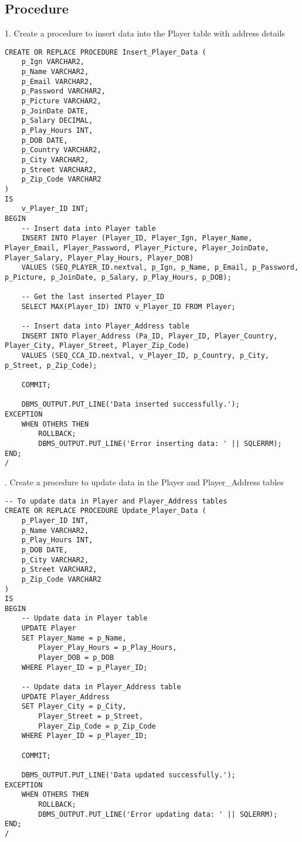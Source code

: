 \clearpage
\subsection{Procedure}
\hrulefill

1. Create a procedure to insert data into the Player table with address details

\begin{lstlisting}[caption={ Query 1},label={lst:q-1}]
CREATE OR REPLACE PROCEDURE Insert_Player_Data (
    p_Ign VARCHAR2,
    p_Name VARCHAR2,
    p_Email VARCHAR2,
    p_Password VARCHAR2,
    p_Picture VARCHAR2,
    p_JoinDate DATE,
    p_Salary DECIMAL,
    p_Play_Hours INT,
    p_DOB DATE,
    p_Country VARCHAR2,
    p_City VARCHAR2,
    p_Street VARCHAR2,
    p_Zip_Code VARCHAR2
)
IS
    v_Player_ID INT;
BEGIN
    -- Insert data into Player table
    INSERT INTO Player (Player_ID, Player_Ign, Player_Name, Player_Email, Player_Password, Player_Picture, Player_JoinDate, Player_Salary, Player_Play_Hours, Player_DOB)
    VALUES (SEQ_PLAYER_ID.nextval, p_Ign, p_Name, p_Email, p_Password, p_Picture, p_JoinDate, p_Salary, p_Play_Hours, p_DOB);

    -- Get the last inserted Player_ID
    SELECT MAX(Player_ID) INTO v_Player_ID FROM Player;

    -- Insert data into Player_Address table
    INSERT INTO Player_Address (Pa_ID, Player_ID, Player_Country, Player_City, Player_Street, Player_Zip_Code)
    VALUES (SEQ_CCA_ID.nextval, v_Player_ID, p_Country, p_City, p_Street, p_Zip_Code);

    COMMIT;

    DBMS_OUTPUT.PUT_LINE('Data inserted successfully.');
EXCEPTION
    WHEN OTHERS THEN
        ROLLBACK;
        DBMS_OUTPUT.PUT_LINE('Error inserting data: ' || SQLERRM);
END;
/

\end{lstlisting}

. Create a procedure to update data in the Player and Player\_Address tables
\begin{lstlisting}[caption={ Query 2},label={lst:q-2}]
    -- To update data in Player and Player_Address tables
CREATE OR REPLACE PROCEDURE Update_Player_Data (
    p_Player_ID INT,
    p_Name VARCHAR2,
    p_Play_Hours INT,
    p_DOB DATE,
    p_City VARCHAR2,
    p_Street VARCHAR2,
    p_Zip_Code VARCHAR2
)
IS
BEGIN
    -- Update data in Player table
    UPDATE Player
    SET Player_Name = p_Name,
        Player_Play_Hours = p_Play_Hours,
        Player_DOB = p_DOB
    WHERE Player_ID = p_Player_ID;

    -- Update data in Player_Address table
    UPDATE Player_Address
    SET Player_City = p_City,
        Player_Street = p_Street,
        Player_Zip_Code = p_Zip_Code
    WHERE Player_ID = p_Player_ID;

    COMMIT;

    DBMS_OUTPUT.PUT_LINE('Data updated successfully.');
EXCEPTION
    WHEN OTHERS THEN
        ROLLBACK;
        DBMS_OUTPUT.PUT_LINE('Error updating data: ' || SQLERRM);
END;
/
\end{lstlisting}

